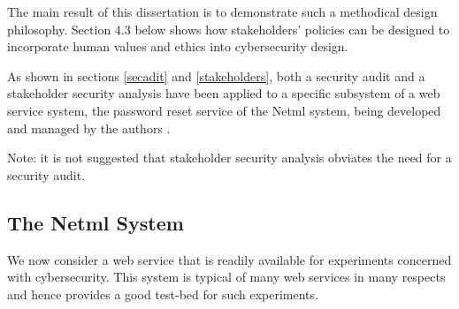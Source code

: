 The main result of this dissertation is to demonstrate such a methodical design philosophy. Section 4.3 below shows how stakeholders' policies can be designed
to incorporate human values and ethics into cybersecurity design.

As shown in sections \ref{secadit} and \ref{stakeholders}, both a security audit and a stakeholder security analysis have been applied to a specific subsystem of a web service system, the password reset service of the Netml system, being developed and managed by the authors \cite{sheniar2018experiments}.

Note: it is not suggested that stakeholder security analysis obviates
the need for a security audit.

\subsection{The Netml System}

We now consider a web service that is readily available for experiments concerned with cybersecurity. This system is typical of many web services in many respects and hence provides a good test-bed for such experiments.

